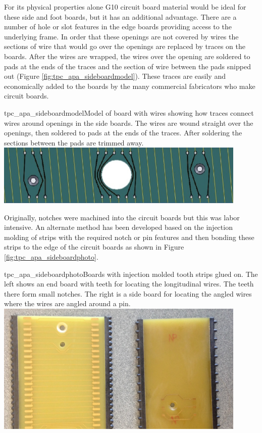 For its physical properties alone G10 circuit board material would be ideal for these side and foot boards, but it has an additional advantage.  There are a number of hole or slot features in the edge boards providing access to the underlying frame.  In order that these openings are not covered by wires the sections of wire that would go over the openings are replaced by traces on the boards.  After the wires are wrapped, the wires over the opening are soldered to pads at the ends of the traces and the section of wire between the pads snipped out (Figure \ref{fig:tpc_apa_sideboardmodel}).  These traces are easily and economically added to the boards by the many commercial fabricators who make circuit boards.

\begin{cdrfigure}{tpc_apa_sideboardmodel}{Model of board with wires showing how traces connect wires around openings in the side boards.  The wires are wound straight over the openings, then soldered to pads at the ends of the traces.  After soldering the sections between the pads are trimmed away.}
\includegraphics[width=0.9\textwidth]{figures/tpc_apa_sideboardmodel.png} 
\end{cdrfigure}

Originally, notches were machined into the circuit boards but this was labor intensive.  An alternate method has been developed based on the injection molding of strips with the required notch or pin features and then bonding these strips to the edge of the circuit boards as shown in Figure \ref{fig:tpc_apa_sideboardphoto}.

\begin{cdrfigure}{tpc_apa_sideboardphoto}{Boards with injection molded tooth strips glued on.  The left shows an end board with teeth for locating the longitudinal wires.  The teeth there form small notches. The right is a side board for locating the angled wires where the wires are angled around a pin.}
\includegraphics[width=0.9\textwidth]{figures/tpc_apa_sideboardphoto.png} 
\end{cdrfigure}

